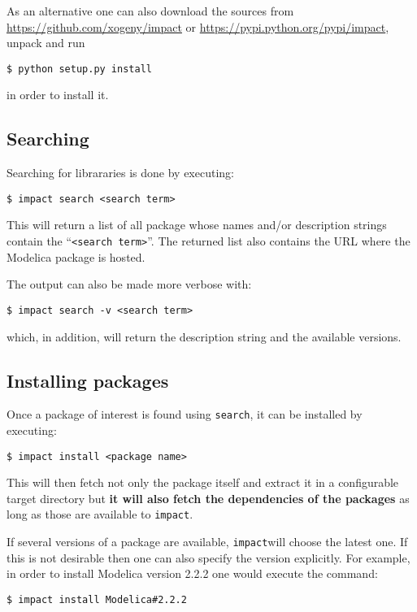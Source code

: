 \documentclass[11pt,a4paper,twocolumn]{article}
\newcommand{\impact}{\texttt{impact}} %
\newcommand{\code}[1]{\texttt{#1}} %
\begin{document}
As an alternative one can also download the sources from
\url{https://github.com/xogeny/impact} or
\url{https://pypi.python.org/pypi/impact},
unpack and run
\begin{verbatim}
$ python setup.py install
\end{verbatim}

in order to install it.

\subsection{Searching} %
\label{cmd:search}

Searching for librararies is done by executing:

\begin{verbatim}
$ impact search <search term>
\end{verbatim}

This will return a list of all package whose names and/or description
strings contain the ``\code{<search term>}''. The returned list also
contains the URL where the Modelica package is hosted.

The output can also be made more verbose with:
\begin{verbatim}
$ impact search -v <search term>
\end{verbatim}
which, in addition, will return the description string and the
available versions.

\subsection{Installing packages} %
\label{cmd:install-pkg}
Once a package of interest is found using \code{search}, it can be
installed by executing:
\begin{verbatim}
$ impact install <package name>
\end{verbatim}
This will then fetch not only the package itself and extract it in a
configurable target directory but \textbf{it will also fetch the
  dependencies of the packages} as long as those are available to
\impact.

If several versions of a package are available, \impact will choose
the latest one. If this is not desirable then one can also specify the
version explicitly. For example, in order to install Modelica version
2.2.2 one would execute the command:
\begin{verbatim}
$ impact install Modelica#2.2.2
\end{verbatim}
\end{document}
